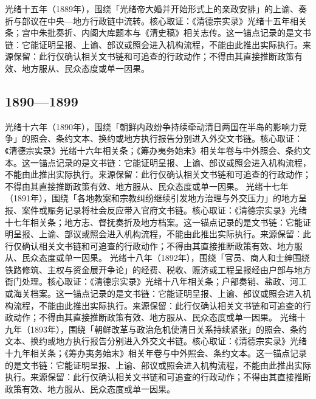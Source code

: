 光绪十五年（1889年），围绕「光绪帝大婚并开始形式上的亲政安排」的上谕、奏折与部议在中央—地方行政链中流转。核心取证：《清德宗实录》光绪十五年相关条；宫中朱批奏折、内阁大库题本与《清史稿》相关志传。这一锚点记录的是文书链：它能证明呈报、上谕、部议或照会进入机构流程，不能由此推出实际执行。来源保留：此行仅确认相关文书链和可追查的行政动作；不得由其直接推断政策有效、地方服从、民众态度或单一因果。
\subsection{1890—1899}
光绪十六年（1890年），围绕「朝鲜内政纷争持续牵动清日两国在半岛的影响力竞争」的照会、条约文本、换约或地方执行报告分别进入外交文书链。核心取证：《清德宗实录》光绪十六年相关条；《筹办夷务始末》相关年卷与中外照会、条约文本。这一锚点记录的是文书链：它能证明呈报、上谕、部议或照会进入机构流程，不能由此推出实际执行。来源保留：此行仅确认相关文书链和可追查的行政动作；不得由其直接推断政策有效、地方服从、民众态度或单一因果。
光绪十七年（1891年），围绕「各地教案和宗教纠纷继续引发地方治理与外交压力」的地方呈报、案件或赈务记录将社会反应带入官府文书链。核心取证：《清德宗实录》光绪十七年相关条；地方志、督抚奏折及地方档案。这一锚点记录的是文书链：它能证明呈报、上谕、部议或照会进入机构流程，不能由此推出实际执行。来源保留：此行仅确认相关文书链和可追查的行政动作；不得由其直接推断政策有效、地方服从、民众态度或单一因果。
光绪十八年（1892年），围绕「官员、商人和士绅围绕铁路修筑、主权与资金展开争论」的经费、税收、赈济或工程呈报经由户部与地方衙门处理。核心取证：《清德宗实录》光绪十八年相关条；户部奏销、盐政、河工或海关档案。这一锚点记录的是文书链：它能证明呈报、上谕、部议或照会进入机构流程，不能由此推出实际执行。来源保留：此行仅确认相关文书链和可追查的行政动作；不得由其直接推断政策有效、地方服从、民众态度或单一因果。
光绪十九年（1893年），围绕「朝鲜改革与政治危机使清日关系持续紧张」的照会、条约文本、换约或地方执行报告分别进入外交文书链。核心取证：《清德宗实录》光绪十九年相关条；《筹办夷务始末》相关年卷与中外照会、条约文本。这一锚点记录的是文书链：它能证明呈报、上谕、部议或照会进入机构流程，不能由此推出实际执行。来源保留：此行仅确认相关文书链和可追查的行政动作；不得由其直接推断政策有效、地方服从、民众态度或单一因果。
